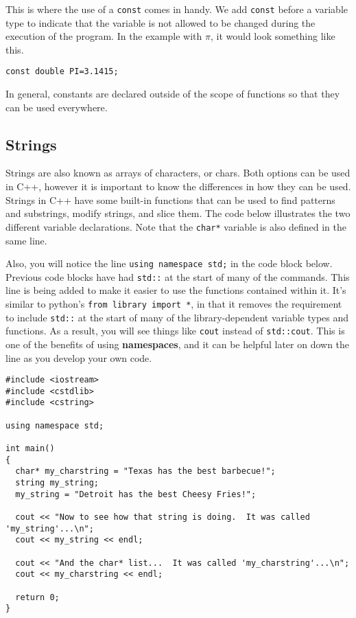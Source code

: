 This is where the use of a \texttt{const} comes in handy.  We add \texttt{const} before a variable type to indicate that the variable is not allowed to be changed during the execution of the program.  In the example with $\pi$, it would look something like this.

\begin{verbatim}
const double PI=3.1415;
\end{verbatim}

In general, constants are declared outside of the scope of functions so that they can be used everywhere.

\subsection*{Strings}
Strings are also known as arrays of characters, or chars.  Both options can be used in C++, however it is important to know the differences in how they can be used.
Strings in C++ have some built-in functions that can be used to find patterns and substrings, modify strings, and slice them.  The code below illustrates the two different variable declarations.  Note that the \texttt{char*} variable is also defined in the same line.

Also, you will notice the line \texttt{using namespace std;} in the code block below.  Previous code blocks have had \texttt{std::} at the start of many of the commands. This line is being added to make it easier to use the functions contained within it. It's similar to python's \texttt{from library import *}, in that it removes the requirement to include \texttt{std::} at the start of many of the library-dependent variable types and functions.  As a result, you will see things like \texttt{cout} instead of \texttt{std::cout}.  This is one of the benefits of using \textbf{namespaces}, and it can be helpful later on down the line as you develop your own code.

\begin{verbatim}
#include <iostream>
#include <cstdlib>
#include <cstring>

using namespace std;

int main()
{
  char* my_charstring = "Texas has the best barbecue!";
  string my_string;
  my_string = "Detroit has the best Cheesy Fries!";

  cout << "Now to see how that string is doing.  It was called 'my_string'...\n";
  cout << my_string << endl;

  cout << "And the char* list...  It was called 'my_charstring'...\n";
  cout << my_charstring << endl;

  return 0;
}
\end{verbatim}

